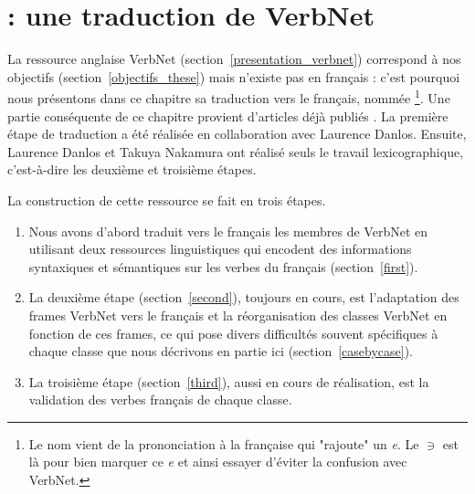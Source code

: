 \chapter{\verbenet{} : une traduction de VerbNet}
\label{ch:verbnet}

La ressource anglaise VerbNet (section~\ref{presentation_verbnet}) correspond à
nos objectifs (section~\ref{objectifs_these}) mais n'existe pas en français :
c'est pourquoi nous présentons dans ce chapitre sa traduction vers le français,
nommée \verbenet{}\footnote{Le nom vient de la prononciation à la française qui
    "rajoute" un \textit{e}. Le $\ni$ est là pour bien marquer ce \textit{e} et
ainsi essayer d'éviter la confusion avec VerbNet.}. Une partie conséquente de
ce chapitre provient d'articles déjà publiés
\citep{danlos2014vers,pradet2014adapting}. La première étape de traduction a
été réalisée en collaboration avec Laurence Danlos. Ensuite, Laurence Danlos et
Takuya Nakamura ont réalisé seuls le travail lexicographique, c'est-à-dire les
deuxième et troisième étapes.

La construction de cette ressource se fait en trois étapes.
\begin{enumerate}
    \item Nous avons d'abord traduit vers le français les membres de VerbNet en
        utilisant deux ressources linguistiques qui encodent des informations
        syntaxiques et sémantiques sur les verbes du français
        (section~\ref{first}).
    \item La deuxième étape (section~\ref{second}), toujours en cours, est
        l'adaptation des frames VerbNet vers le français et la réorganisation
        des classes VerbNet en fonction de ces frames, ce qui pose divers
        difficultés souvent spécifiques à chaque classe que nous décrivons en
        partie ici (section~\ref{casebycase}).
    \item La troisième étape (section~\ref{third}), aussi en cours de
        réalisation, est la validation des verbes français de chaque classe.
\end{enumerate}

